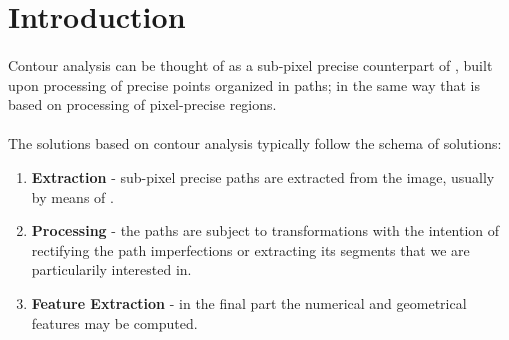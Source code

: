 \section{Introduction}

\paragraph*{}
Contour analysis can be thought of as a sub-pixel precise counterpart of , built upon processing of precise points organized in paths; in the same way that  is based on processing of pixel-precise regions.

\paragraph*{}
The solutions based on contour analysis typically follow the schema of  solutions:

\begin{enumerate}
	\item \textbf{Extraction} - sub-pixel precise paths are extracted from the image, usually by means of .
	\item \textbf{Processing} - the paths are subject to transformations with the intention of rectifying the path imperfections or extracting its segments that we are particularily interested in.
	\item \textbf{Feature Extraction} - in the final part the numerical and geometrical features may be computed.
\end{enumerate}